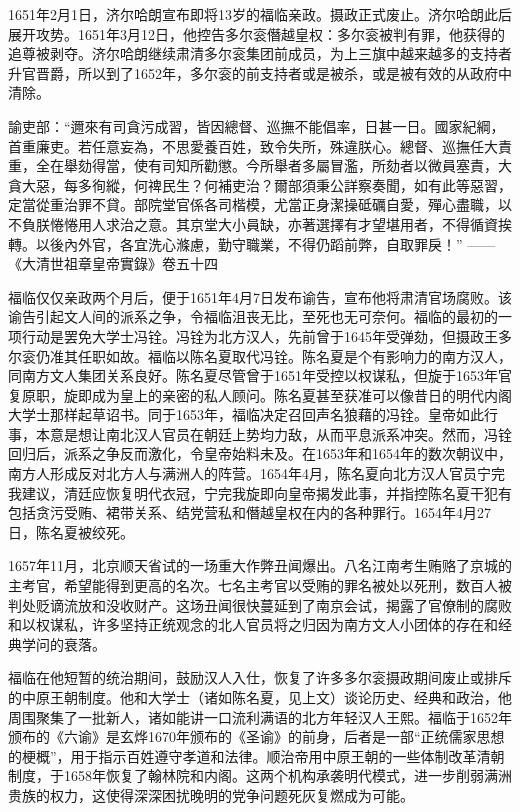 1651年2月1日，济尔哈朗宣布即将13岁的福临亲政。摄政正式废止。济尔哈朗此后展开攻势。1651年3月12日，他控告多尔衮僭越皇权：多尔衮被判有罪，他获得的追尊被剥夺。济尔哈朗继续肃清多尔衮集团前成员，为上三旗中越来越多的支持者升官晋爵，所以到了1652年，多尔衮的前支持者或是被杀，或是被有效的从政府中清除。

諭吏部：“邇來有司貪污成習，皆因總督、巡撫不能倡率，日甚一日。國家紀綱，首重廉吏。若任意妄為，不思愛養百姓，致令失所，殊違朕心。總督、巡撫任大責重，全在舉劾得當，使有司知所勸懲。今所舉者多屬冒濫，所劾者以微員塞責，大貪大惡，每多徇縱，何禆民生？何補吏治？爾部須秉公詳察奏聞，如有此等惡習，定當從重治罪不貸。部院堂官係各司楷模，尤當正身潔操砥礪自愛，殫心盡職，以不負朕惓惓用人求治之意。其京堂大小員缺，亦著選擇有才望堪用者，不得循資挨轉。以後內外官，各宜洗心滌慮，勤守職業，不得仍蹈前弊，自取罪戾！” —— 《大清世祖章皇帝實錄》卷五十四

福临仅仅亲政两个月后，便于1651年4月7日发布谕告，宣布他将肃清官场腐败。该谕告引起文人间的派系之争，令福临沮丧无比，至死也无可奈何。福临的最初的一项行动是罢免大学士冯铨。冯铨为北方汉人，先前曾于1645年受弹劾，但摄政王多尔衮仍准其任职如故。福临以陈名夏取代冯铨。陈名夏是个有影响力的南方汉人，同南方文人集团关系良好。陈名夏尽管曾于1651年受控以权谋私，但旋于1653年官复原职，旋即成为皇上的亲密的私人顾问。陈名夏甚至获准可以像昔日的明代内阁大学士那样起草诏书。同于1653年，福临决定召回声名狼藉的冯铨。皇帝如此行事，本意是想让南北汉人官员在朝廷上势均力敌，从而平息派系冲突。然而，冯铨回归后，派系之争反而激化，令皇帝始料未及。在1653年和1654年的数次朝议中，南方人形成反对北方人与满洲人的阵营。1654年4月，陈名夏向北方汉人官员宁完我建议，清廷应恢复明代衣冠，宁完我旋即向皇帝揭发此事，并指控陈名夏干犯有包括贪污受贿、裙带关系、结党营私和僭越皇权在内的各种罪行。1654年4月27日，陈名夏被绞死。

1657年11月，北京顺天省试的一场重大作弊丑闻爆出。八名江南考生贿赂了京城的主考官，希望能得到更高的名次。七名主考官以受贿的罪名被处以死刑，数百人被判处贬谪流放和没收财产。这场丑闻很快蔓延到了南京会试，揭露了官僚制的腐败和以权谋私，许多坚持正统观念的北人官员将之归因为南方文人小团体的存在和经典学问的衰落。

福临在他短暂的统治期间，鼓励汉人入仕，恢复了许多多尔衮摄政期间废止或排斥的中原王朝制度。他和大学士（诸如陈名夏，见上文）谈论历史、经典和政治，他周围聚集了一批新人，诸如能讲一口流利满语的北方年轻汉人王熙。福临于1652年颁布的《六谕》是玄烨1670年颁布的《圣谕》的前身，后者是一部“正统儒家思想的梗概”，用于指示百姓遵守孝道和法律。顺治帝用中原王朝的一些体制改革清朝制度，于1658年恢复了翰林院和内阁。这两个机构承袭明代模式，进一步削弱满洲贵族的权力，这使得深深困扰晚明的党争问题死灰复燃成为可能。

